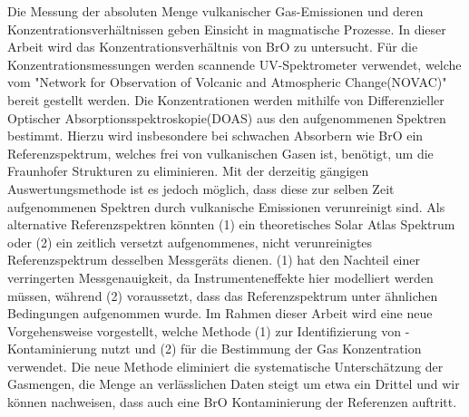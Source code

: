 Die Messung der absoluten Menge vulkanischer Gas-Emissionen und deren Konzentrationsverhältnissen geben Einsicht in magmatische Prozesse.
In dieser Arbeit wird das Konzentrationsverhältnis von BrO zu  untersucht.
Für die Konzentrationsmessungen werden scannende UV-Spektrometer verwendet, welche vom "Network for Observation of Volcanic and Atmospheric Change(NOVAC)" bereit gestellt werden.
Die Konzentrationen werden mithilfe von Differenzieller Optischer Absorptionsspektroskopie(DOAS) aus den aufgenommenen Spektren bestimmt. Hierzu wird insbesondere bei schwachen Absorbern wie BrO ein Referenzspektrum, welches frei von vulkanischen Gasen ist, benötigt, um die Fraunhofer Strukturen zu eliminieren. Mit der derzeitig gängigen Auswertungsmethode ist es jedoch möglich, dass diese zur selben Zeit aufgenommenen Spektren durch vulkanische Emissionen verunreinigt sind. Als alternative Referenzspektren könnten (1) ein theoretisches Solar Atlas Spektrum oder (2) ein zeitlich versetzt aufgenommenes, nicht verunreinigtes Referenzspektrum desselben Messgeräts dienen. (1) hat den Nachteil einer verringerten Messgenauigkeit, da Instrumenteneffekte hier modelliert werden müssen, während (2) voraussetzt, dass das Referenzspektrum unter ähnlichen Bedingungen aufgenommen wurde. Im Rahmen dieser Arbeit wird eine neue Vorgehensweise vorgestellt, welche Methode (1) zur Identifizierung von -Kontaminierung nutzt und (2) für die Bestimmung der Gas Konzentration verwendet. Die neue Methode eliminiert  die systematische Unterschätzung der Gasmengen, die Menge an verlässlichen Daten steigt um etwa ein Drittel und wir können nachweisen, dass auch eine BrO Kontaminierung der Referenzen auftritt.


